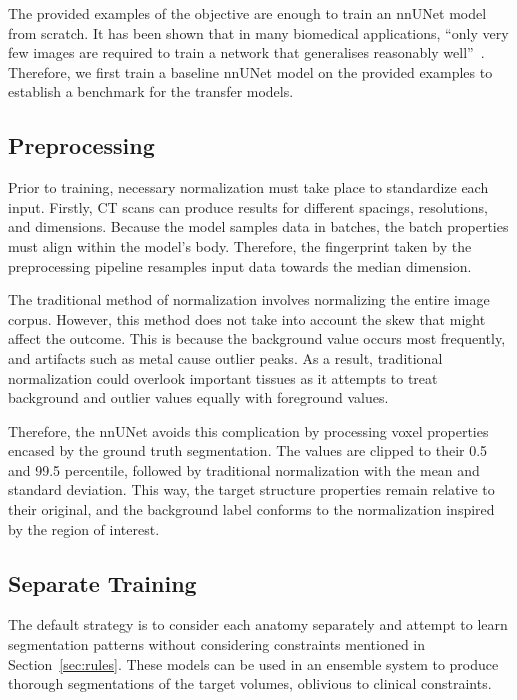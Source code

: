 \documentclass[12pt,twoside]{report}
\begin{document}
The provided examples of the objective are enough to train an nnUNet model from scratch. It has been shown that in many biomedical applications, ``only very few images are required to train a network that generalises reasonably well''~\cite{DBLP:journals/corr/CicekALBR16}. Therefore, we first train a baseline nnUNet model on the provided examples to establish a benchmark for the transfer models.

\subsection{Preprocessing}

Prior to training, necessary normalization must take place to standardize each input. Firstly, CT scans can produce results for different spacings, resolutions, and dimensions. Because the model samples data in batches, the batch properties must align within the model's body. Therefore, the fingerprint taken by the preprocessing pipeline resamples input data towards the median dimension. 

The traditional method of normalization involves normalizing the entire image corpus. However, this method does not take into account the skew that might affect the outcome. This is because the background value occurs most frequently, and artifacts such as metal cause outlier peaks. As a result, traditional normalization could overlook important tissues as it attempts to treat background and outlier values equally with foreground values.

Therefore, the nnUNet avoids this complication by processing voxel properties encased by the ground truth segmentation. The values are clipped to their 0.5 and 99.5 percentile, followed by traditional normalization with the mean and standard deviation. This way, the target structure properties remain relative to their original, and the background label conforms to the normalization inspired by the region of interest.

\subsection{Separate Training}

The default strategy is to consider each anatomy separately and attempt to learn segmentation patterns without considering constraints mentioned in Section~\ref{sec:rules}. These models can be used in an ensemble system to produce thorough segmentations of the target volumes, oblivious to clinical constraints. 
\end{document}

